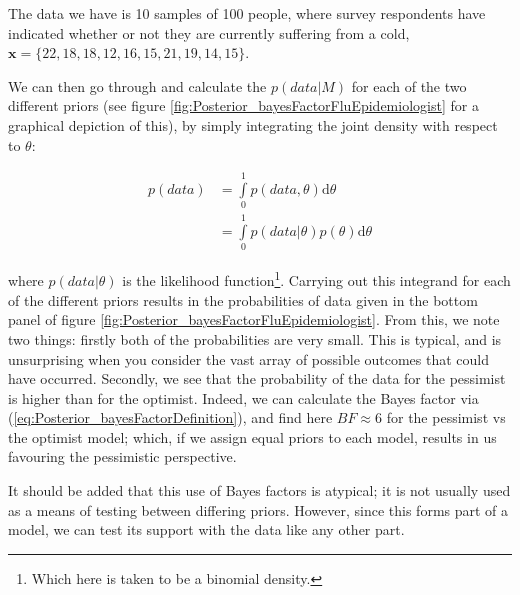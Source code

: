 \documentclass[11pt,fullpage]{book}
\begin{document}
The data we have is 10 samples of 100 people, where survey respondents have indicated whether or not they are currently suffering from a cold, $\boldsymbol{x} = \{22, 18, 18, 12, 16, 15, 21, 19, 14, 15\}$. 

We can then go through and calculate the $p(data|M)$ for each of the two different priors (see figure \ref{fig:Posterior_bayesFactorFluEpidemiologist} for a graphical depiction of this), by simply integrating the joint density with respect to $\theta$:

\begin{equation}
\begin{align}
p(data) &= \int\limits_{0}^{1} p(data,\theta) \mathrm{d}\theta\\
&= \int\limits_{0}^{1} p(data|\theta) p(\theta) \mathrm{d}\theta
\end{align}
\end{equation}

where $p(data|\theta)$ is the likelihood function\footnote{Which here is taken to be a binomial density.}. Carrying out this integrand for each of the different priors results in the probabilities of data given in the bottom panel of figure \ref{fig:Posterior_bayesFactorFluEpidemiologist}. From this, we note two things: firstly both of the probabilities are very small. This is typical, and is unsurprising when you consider the vast array of possible outcomes that could have occurred. Secondly, we see that the probability of the data for the pessimist is higher than for the optimist. Indeed, we can calculate the Bayes factor via (\ref{eq:Posterior_bayesFactorDefinition}), and find here $BF \approx 6$ for the pessimist vs the optimist model; which, if we assign equal priors to each model, results in us favouring the pessimistic perspective.

It should be added that this use of Bayes factors is atypical; it is not usually used as a means of testing between differing priors. However, since this forms part of a model, we can test its support with the data like any other part.
\end{document}
